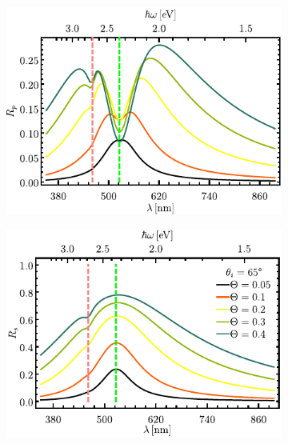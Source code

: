 		\begin{figure}[h!]\centering\hspace*{-1.5em}
	\begin{subfigure}{.01\linewidth}\caption{}\label{sfig:FSM-cutp}\vspace{4.5cm}\end{subfigure}
	\begin{subfigure}{.45\linewidth}\hspace*{-1.5em}
	\includegraphics[scale=1]{2-Resultados/figs/4-Wp4FSMThetaVar/cut_angle_65_p.pdf}\end{subfigure}
	\begin{subfigure}{.01\linewidth}\caption{}\label{sfig:FSM-cuts}\vspace{4.5cm}\end{subfigure}\hspace*{-1.em}
	\begin{subfigure}{.45\linewidth}\centering
	\includegraphics[scale=1 ]{2-Resultados/figs/4-Wp4FSMThetaVar/cut_angle_65_s.pdf}\end{subfigure}\vspace*{-.7em}

\end{figure}
